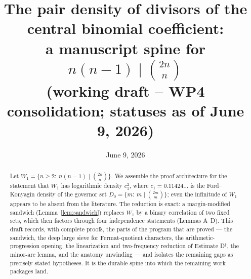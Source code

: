 \documentclass[11pt]{article}
\title{The pair density of divisors of the central binomial coefficient:\\
a manuscript spine for $n(n-1)\mid\binom{2n}{n}$\\
\large (working draft -- WP4 consolidation; statuses as of June 9, 2026)}
\author{}
\date{June 9, 2026}
\theoremstyle{definition}
\theoremstyle{remark}
\newcommand{\D}{D_0}
\newcommand{\W}{W_1}
\begin{document}
\maketitle

\begin{abstract}
Let $\W=\{n\ge2:\ n(n-1)\mid\binom{2n}{n}\}$. We assemble the proof
architecture for the statement that $\W$ has logarithmic density
$c_1^2$, where $c_1=0.11424\ldots$ is the Ford--Konyagin density of the
governor set $\D=\{m:\ m\mid\binom{2m}{m}\}$; even the infinitude of
$\W$ appears to be absent from the literature. The reduction is exact: a
margin-modified sandwich (Lemma~\ref{lem:sandwich}) replaces $\W$ by a
binary correlation of two fixed sets, which then factors through four
independence statements (Lemmas A--D). This draft records, with complete
proofs, the parts of the program that are proved --- the sandwich, the deep
large sieve for Fermat-quotient characters, the arithmetic-progression
opening, the linearization and two-frequency reduction of Estimate
D$^\dagger$, the minor-arc lemma, and the anatomy unwinding --- and isolates
the remaining gaps as precisely stated hypotheses. It is the durable spine
into which the remaining work packages land.
\end{abstract}

\tableofcontents

















\appendix




\end{document}
